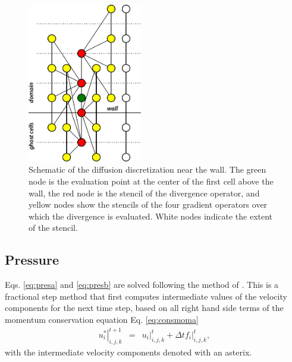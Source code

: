 \documentclass[gmd,manuscript]{copernicus}
\begin{document}
\begin{figure}[t]
	\vspace*{2mm}
	\begin{center}
		\includegraphics[width=5cm]{figs/stencil_wall.pdf}
	\end{center}
	\caption{Schematic of the diffusion discretization near the wall. The green node is the evaluation point at the center of the first cell above the wall, the red node is the stencil of the divergence operator, and yellow nodes show the stencils of the four gradient operators over which the divergence is evaluated. White nodes indicate the extent of the stencil.} \label{fig:stencil_wall}
\end{figure}
\subsection{Pressure}
Eqs. \ref{eq:presa} and \ref{eq:presb} are solved following the method of \citet{Chorin1968}. This is a fractional step method that first computes intermediate values of the velocity components for the next time step, based on all right hand side terms of the momentum conservation equation Eq. \ref{eq:consmoma}
\begin{eqnarray}
\left. u_i^* \right|^{t+1}_{i,j,k} & = & \left. u_i \right|^{t}_{i,j,k} + \Delta t \left. f_i \right|^{t}_{i,j,k},
\end{eqnarray}
with the intermediate velocity components denoted with an asterix.
\end{document}
